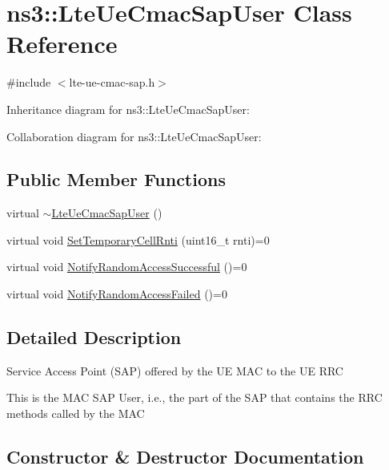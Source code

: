 \hypertarget{classns3_1_1LteUeCmacSapUser}{}\section{ns3\+:\+:Lte\+Ue\+Cmac\+Sap\+User Class Reference}
\label{classns3_1_1LteUeCmacSapUser}


{\ttfamily \#include $<$lte-\/ue-\/cmac-\/sap.\+h$>$}



Inheritance diagram for ns3\+:\+:Lte\+Ue\+Cmac\+Sap\+User\+:


Collaboration diagram for ns3\+:\+:Lte\+Ue\+Cmac\+Sap\+User\+:
\subsection*{Public Member Functions}
\begin{DoxyCompactItemize}
\item 
virtual \hyperlink{classns3_1_1LteUeCmacSapUser_aaa5f4863f6c707af945d0dbb96398c9f}{$\sim$\+Lte\+Ue\+Cmac\+Sap\+User} ()
\item 
virtual void \hyperlink{classns3_1_1LteUeCmacSapUser_ad094e1492ca1603efa22398ba854af77}{Set\+Temporary\+Cell\+Rnti} (uint16\+\_\+t rnti)=0
\item 
virtual void \hyperlink{classns3_1_1LteUeCmacSapUser_a697ea79347ad5d2ff5e136240255b8e0}{Notify\+Random\+Access\+Successful} ()=0
\item 
virtual void \hyperlink{classns3_1_1LteUeCmacSapUser_a26992a42cbbe7f81d8eb80dadc15a96d}{Notify\+Random\+Access\+Failed} ()=0
\end{DoxyCompactItemize}


\subsection{Detailed Description}
Service Access Point (S\+AP) offered by the UE M\+AC to the UE R\+RC

This is the M\+AC S\+AP User, i.\+e., the part of the S\+AP that contains the R\+RC methods called by the M\+AC 

\subsection{Constructor \& Destructor Documentation}
